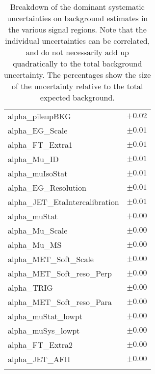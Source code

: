 \begin{table}
\begin{center}
\begin{tabular*}{\textwidth}{@{\extracolsep{\fill}}lc}
alpha\_pileupBKG         & $\pm 0.02$       \\
alpha\_EG\_Scale         & $\pm 0.01$       \\
alpha\_FT\_Extra1         & $\pm 0.01$       \\
alpha\_Mu\_ID         & $\pm 0.01$       \\
alpha\_muIsoStat         & $\pm 0.01$       \\
alpha\_EG\_Resolution         & $\pm 0.01$       \\
alpha\_JET\_EtaIntercalibration         & $\pm 0.01$       \\
alpha\_muStat         & $\pm 0.00$       \\
alpha\_Mu\_Scale         & $\pm 0.00$       \\
alpha\_Mu\_MS         & $\pm 0.00$       \\
alpha\_MET\_Soft\_Scale         & $\pm 0.00$       \\
alpha\_MET\_Soft\_reso\_Perp         & $\pm 0.00$       \\
alpha\_TRIG         & $\pm 0.00$       \\
alpha\_MET\_Soft\_reso\_Para         & $\pm 0.00$       \\
alpha\_muStat\_lowpt         & $\pm 0.00$       \\
alpha\_muSys\_lowpt         & $\pm 0.00$       \\
alpha\_FT\_Extra2         & $\pm 0.00$       \\
alpha\_JET\_AFII         & $\pm 0.00$       \\
\noalign{\smallskip}\hline\noalign{\smallskip}
\end{tabular*}
\end{center}
\caption[Breakdown of uncertainty on background estimates]{
Breakdown of the dominant systematic uncertainties on background estimates in the various signal regions.
Note that the individual uncertainties can be correlated, and do not necessarily add up quadratically to 
the total background uncertainty. The percentages show the size of the uncertainty relative to the total expected background.
\label{table.results.bkgestimate.uncertainties.SR3L1b2}}
\end{table}
\clearpage
%